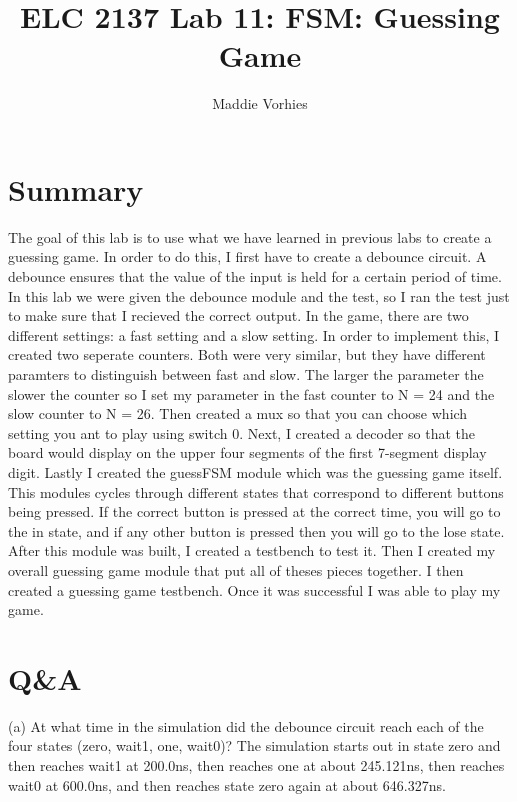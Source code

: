 \documentclass[11pt]{article}
\begin{document}
\title{ELC 2137 Lab 11: FSM: Guessing Game}
\author{Maddie Vorhies}

\maketitle


\section*{Summary}

The goal of this lab is to use what we have learned in previous labs to create a guessing game. In order to do this, I first have to create a debounce circuit. A debounce ensures that the value of the input is held for a certain period of time. In this lab we were given the debounce module and the test, so I ran the test just to make sure that I recieved the correct output. In the game, there are two different settings: a fast setting and a slow setting. In order to implement this, I created two seperate counters. Both were very similar, but they have different paramters to distinguish between fast and slow. The larger the parameter the slower the counter so I set my parameter in the fast counter to N = 24 and the slow counter to N = 26. Then  created a mux so that you can choose which setting you ant to play using switch 0. Next, I created a decoder so that the board would display on the upper four segments of the first 7-segment display digit. Lastly I created the guessFSM module which was the guessing game itself. This modules cycles through different states that correspond to different buttons being pressed. If the correct button is pressed at the correct time, you will go to the in state, and if any other button is pressed then you will go to the lose state. After this module was built, I created a testbench to test it. Then I created my overall guessing game module that put all of theses pieces together. I then created a guessing game testbench. Once it was successful I was able to play my game.


\section*{Q\&A}

(a) At what time in the simulation did the debounce circuit reach each of the four states (zero, wait1, one, wait0)? \newline
The simulation starts out in state zero and then reaches wait1 at 200.0ns, then reaches one at about 245.121ns, then reaches wait0 at 600.0ns, and then reaches state zero again at about 646.327ns. \newline 
\end{document}
